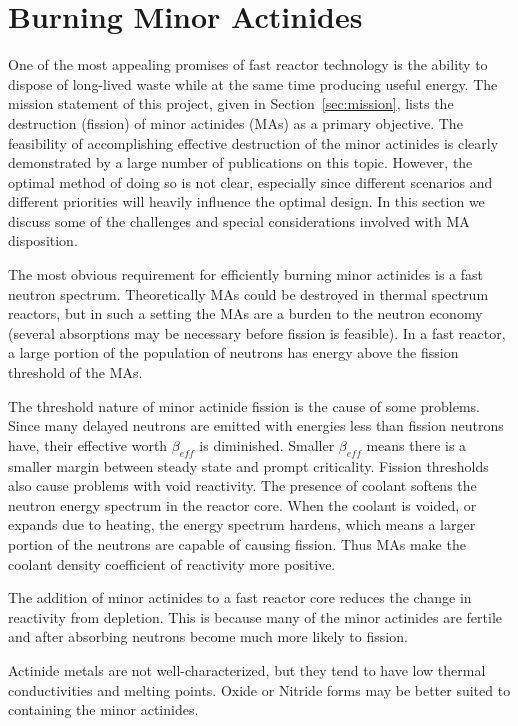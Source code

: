 \documentclass[]{report}
\begin{document}
\section{Burning Minor Actinides}
One of the most appealing promises of fast reactor technology is the ability to dispose of long-lived waste while at the same time producing useful energy.
The mission statement of this project, given in Section~\ref{sec:mission}, lists the destruction (fission) of minor actinides (MAs) as a primary objective.
The feasibility of accomplishing effective destruction of the minor actinides is clearly demonstrated by a large number of publications on this topic. However, the optimal method of doing so is not clear, especially since different scenarios and different priorities will heavily influence the optimal design.
In this section we discuss some of the challenges and special considerations involved with MA disposition.

The most obvious requirement for efficiently burning minor actinides is a fast neutron spectrum. Theoretically MAs could be destroyed in thermal spectrum reactors, but in such a setting the MAs are a burden to the neutron economy (several absorptions may be necessary before fission is feasible). 
In a fast reactor, a large portion of the population of neutrons has energy above the fission threshold of the MAs.

The threshold nature of minor actinide fission is the cause of some problems. Since many delayed neutrons are emitted with energies less than fission neutrons have, their effective worth $\beta_{eff}$ is diminished. Smaller $\beta_{eff}$ means there is a smaller margin between steady state and prompt criticality.
Fission thresholds also cause problems with void reactivity. The presence of coolant softens the neutron energy spectrum in the reactor core. When the coolant is voided, or expands due to heating, the energy spectrum hardens, which means a larger portion of the neutrons are capable of causing fission. Thus MAs make the coolant density coefficient of reactivity more positive.

The addition of minor actinides to a fast reactor core reduces the change in reactivity from depletion. This is because many of the minor actinides are fertile and after absorbing neutrons become much more likely to fission.

Actinide metals are not well-characterized, but they tend to have low thermal conductivities and melting points. Oxide or Nitride forms may be better suited to containing the minor actinides.
\end{document}
